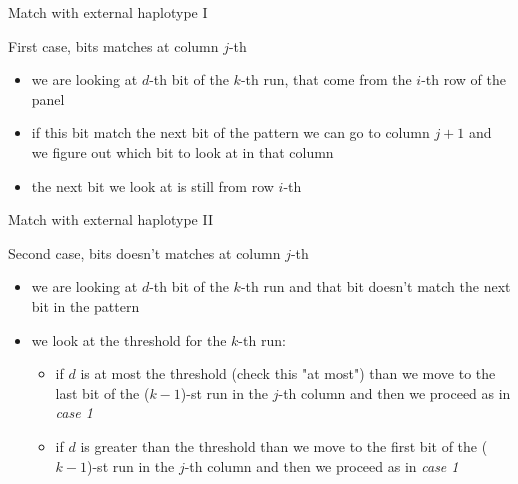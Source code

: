 \documentclass{beamer}
\begin{document}
\begin{frame}{Match with external haplotype I}
  \begin{block}{First case, bits matches at column $j$-th}
    \begin{itemize}
      \item we are looking at $d$-th bit of the $k$-th run, that come from the
      $i$-th row of the panel 
      \item if this bit match the next bit of the pattern we can go to column
      $j+1$ and we figure out which bit to look at in that column 
      \item the next bit we look at is still from row $i$-th
    \end{itemize}
  \end{block}
\end{frame}
\begin{frame}{Match with external haplotype II}
  \begin{block}{Second case, bits doesn't matches at column $j$-th}
    \begin{itemize}
      \item we are looking at $d$-th bit of the $k$-th run and that bit
      doesn't match the next bit in the pattern 
      \item we look at the threshold for the $k$-th run:
      \begin{itemize}
        \item if $d$ is at most the threshold (check this "at most") than we
        move to the last bit of the ($k-1$)-st run in the $j$-th column and
        then we proceed as in \textit{case 1}  
        \item if $d$ is greater than the threshold than we move to the first
        bit of the ($k-1$)-st run in the $j$-th column and then we proceed
        as in \textit{case 1}  
      \end{itemize}
    \end{itemize}
  \end{block}
\end{frame}
%   
%   
\end{document}

